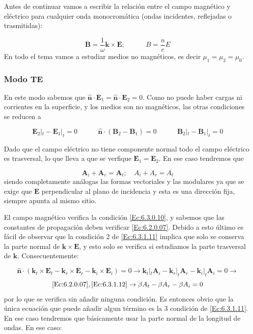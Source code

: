 \documentclass[12pt,a4paper]{article}
\newcommand{\tquad}{\quad \quad \quad}
\newcommand{\Bn}{\mathbf{B}}
\newcommand{\En}{\mathbf{E}}
\newcommand{\kn}{\mathbf{k}}
\newcommand{\An}{\mathbf{A}}
\newcommand{\hnn}{\hat{\mathbf{n}}}
\numberwithin{equation}{section}
\numberwithin{figure}{section}
\begin{document}
Antes de continuar vamos a escribir la relación entre el campo magnético y eléctrico para cualquier onda monocromática (ondas incidentes, reflejadas o trasmitidas):

\begin{equation}
\Bn = \dfrac{1}{\omega} \kn \times \En; \tquad B = \dfrac{n}{c} E \label{Ec:6.3.0.10} 
\end{equation}
En todo el tema vamos a estudiar medios no magnéticos, es decir $\mu_1 = \mu_2 = \mu_0$.

\subsubsection{Modo TE}

En este modo sabemos que $\hnn \cdot \En_1 = \hnn \cdot \En_2 =0$. Como no puede haber cargas ni corrientes en la superficie, y los medios son no magnéticos, las otras condiciones se reducen a

\begin{equation}
 \En_{2} |_t -\En_{1} |_t =0 \tquad
\hnn \cdot (\Bn_2-\Bn_1)=0   \tquad \Bn_{2} |_t  - \Bn_{1} |_t = 0  \label{Ec:6.3.1.11} 
\end{equation}

Dado que el campo eléctrico no tiene componente normal todo el campo eléctrico es trasversal, lo que lleva a que se verfique $\En_1 = \En_2$. En ese caso tendremos que

\begin{equation}
\An_i  + \An_r = \An_t; \quad A_i + A_r = A_t  \label{Ec:6.3.1.12} 
\end{equation} 
siendo completamente análogas las formas vectoriales y las modulares ya que se exige que $\En$ perpendicular al plano de incidencia y esta es una dirección fija, siempre apunta al mismo sitio.
 
El campo magnético verifica la condición \ref{Ec:6.3.0.10}, y sabemos que las constantes de propagación deben verificar \ref{Ec:6.2.0.07}. Debido a esto último es fácil de observar que la condición 2 de \ref{Ec:6.3.1.11} implica que solo se conserva la parte normal de $\kn \times \En$, y esto solo se  verifica si estudiamos la parte trasversal de $\kn$. Consecuentemente:

$$  \hnn \cdot (\kn_t \times \En_t -  \kn_r \times \En_r - \kn_i \times \En_i ) = 0    \longrightarrow   \kn_t |_t  \An_i - \kn_r |_t \An_r - \kn_i |_t \An_i = 0 \longrightarrow $$
$$ \eqref{Ec:6.2.0.07}, \eqref{Ec:6.3.1.12} \rightarrow  \beta  A_t - \beta A_r - \beta A_i = 0  $$
por lo que se verifica sin añadir ninguna condición. Es entonces obvio que la única ecuación que puede añadir algun término es la 3 condición de \ref{Ec:6.3.1.11}. En ese caso tendremos que básicamente usar la parte normal de la longitud de ondas. En ese caso:
\end{document}
